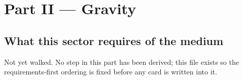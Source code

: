 \part{Part II --- Gravity}

\chapter{What this sector requires of the medium}

Not yet walked. No step in this part has been derived; this file exists so the
requirements-first ordering is fixed before any card is written into it.
